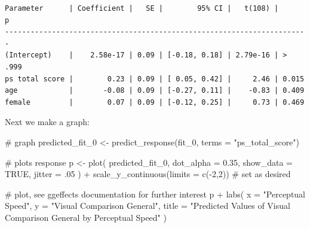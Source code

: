 \documentclass[
  single column]{article}
\newenvironment{Shaded}{\begin{snugshade}}{\end{snugshade}}
\newcommand{\AttributeTok}[1]{\textcolor[rgb]{0.40,0.45,0.13}{#1}}
\newcommand{\CommentTok}[1]{\textcolor[rgb]{0.37,0.37,0.37}{#1}}
\newcommand{\ConstantTok}[1]{\textcolor[rgb]{0.56,0.35,0.01}{#1}}
\newcommand{\DecValTok}[1]{\textcolor[rgb]{0.68,0.00,0.00}{#1}}
\newcommand{\FloatTok}[1]{\textcolor[rgb]{0.68,0.00,0.00}{#1}}
\newcommand{\FunctionTok}[1]{\textcolor[rgb]{0.28,0.35,0.67}{#1}}
\newcommand{\NormalTok}[1]{\textcolor[rgb]{0.00,0.23,0.31}{#1}}
\newcommand{\OtherTok}[1]{\textcolor[rgb]{0.00,0.23,0.31}{#1}}
\newcommand{\SpecialCharTok}[1]{\textcolor[rgb]{0.37,0.37,0.37}{#1}}
\newcommand{\StringTok}[1]{\textcolor[rgb]{0.13,0.47,0.30}{#1}}
\begin{document}
\begin{verbatim}
Parameter      | Coefficient |   SE |        95% CI |   t(108) |      p
-----------------------------------------------------------------------
(Intercept)    |    2.58e-17 | 0.09 | [-0.18, 0.18] | 2.79e-16 | > .999
ps total score |        0.23 | 0.09 | [ 0.05, 0.42] |     2.46 | 0.015 
age            |       -0.08 | 0.09 | [-0.27, 0.11] |    -0.83 | 0.409 
female         |        0.07 | 0.09 | [-0.12, 0.25] |     0.73 | 0.469 
\end{verbatim}

Next we make a graph:

\begin{Shaded}
\begin{Highlighting}[]
\CommentTok{\# graph}
\NormalTok{predicted\_fit\_0 }\OtherTok{\textless{}{-}} \FunctionTok{predict\_response}\NormalTok{(fit\_0, }\AttributeTok{terms =} \StringTok{"ps\_total\_score"}\NormalTok{)}


\CommentTok{\# plots response}
\NormalTok{p }\OtherTok{\textless{}{-}} \FunctionTok{plot}\NormalTok{( }
\NormalTok{  predicted\_fit\_0, }
  \AttributeTok{dot\_alpha =} \FloatTok{0.35}\NormalTok{,}
  \AttributeTok{show\_data =} \ConstantTok{TRUE}\NormalTok{,}
  \AttributeTok{jitter =}\NormalTok{ .}\DecValTok{05}
\NormalTok{  )  }\SpecialCharTok{+}  \FunctionTok{scale\_y\_continuous}\NormalTok{(}\AttributeTok{limits =} \FunctionTok{c}\NormalTok{(}\SpecialCharTok{{-}}\DecValTok{2}\NormalTok{,}\DecValTok{2}\NormalTok{)) }\CommentTok{\# set as desired}
\end{Highlighting}
\end{Shaded}

\begin{Shaded}
\begin{Highlighting}[]
\CommentTok{\# plot, see \textquotesingle{}ggeffects\textquotesingle{} documentation for further interest}
\NormalTok{p }\SpecialCharTok{+} \FunctionTok{labs}\NormalTok{(}
    \AttributeTok{x =} \StringTok{"Perceptual Speed"}\NormalTok{,}
    \AttributeTok{y =} \StringTok{"Visual Comparison General"}\NormalTok{,}
    \AttributeTok{title =} \StringTok{"Predicted Values of Visual Comparison General by Perceptual Speed"}
\NormalTok{  )}
\end{Highlighting}
\end{Shaded}
\end{document}
